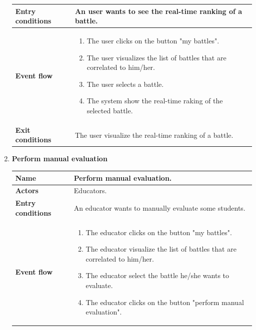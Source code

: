 \begin{enumerate}[label=\textbf{UC.\arabic*}]
\begin{table}[H]
\begin{tabular}{|m{3.2cm}|m{9.8cm}|}
                    \hline
                    \textbf{Entry conditions}  & An user wants to see the real-time ranking of a battle. \\
                    \hline
                    \textbf{Event flow}  & 
                    \begin{enumerate}[label=\arabic*.]
                        \item The user clicks on the button "my battles".
                        \item The user visualizes the list of battles that are correlated to him/her.
                        \item The user selects a battle.
                        \item The system show the real-time raking of the selected battle.
                    \end{enumerate}\\ 
                    \hline
                    \textbf{Exit conditions}  & The user visualize the real-time ranking of a battle. \\
                    \hline
                \end{tabular}
        \end{table}
        \item {} \textbf{Perform manual evaluation}
        \begin{table}[H]
    	    \centering
                \renewcommand{\arraystretch}{1.5}
                \begin{tabular}{|m{3.2cm}|m{9.8cm}|}
                    \hline
                    \textbf{Name} & Perform manual evaluation. \\
                    \hline
                    \textbf{Actors} & Educators. \\
                    \hline
                    \textbf{Entry conditions}  & An educator wants to manually evaluate some students. \\
                    \hline
                    \textbf{Event flow}  & 
                    \begin{enumerate}[label=\arabic*.]
                        \item The educator clicks on the button "my battles".
                        \item The educator visualize the list of battles that are correlated to him/her.
                        \item The educator select the battle he/she wants to evaluate.
                        \item The educator clicks on the button "perform manual evaluation".

\end{enumerate}
\end{tabular}
\end{table}
\end{enumerate}

